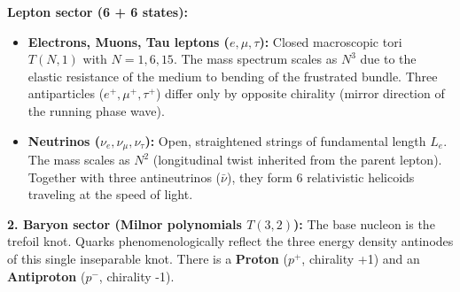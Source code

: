 \documentclass[11pt,a4paper]{article}
\begin{document}
\textbf{Lepton sector (6 + 6 states):}
\begin{itemize}
    \item \textbf{Electrons, Muons, Tau leptons ($e, \mu, \tau$):} Closed macroscopic tori $T(N,1)$ with $N = 1, 6, 15$. The mass spectrum scales as $N^3$ due to the elastic resistance of the medium to bending of the frustrated bundle. Three antiparticles ($e^+, \mu^+, \tau^+$) differ only by opposite chirality (mirror direction of the running phase wave).
    \item \textbf{Neutrinos ($\nu_e, \nu_\mu, \nu_\tau$):} Open, straightened strings of fundamental length $L_e$. The mass scales as $N^2$ (longitudinal twist inherited from the parent lepton). Together with three antineutrinos ($\bar{\nu}$), they form 6 relativistic helicoids traveling at the speed of light.
\end{itemize}

\textbf{2. Baryon sector (Milnor polynomials $T(3,2)$):}
The base nucleon is the trefoil knot. Quarks phenomenologically reflect the three energy density antinodes of this single inseparable knot. There is a \textbf{Proton} ($p^+$, chirality +1) and an \textbf{Antiproton} ($p^-$, chirality -1).
\end{document}
